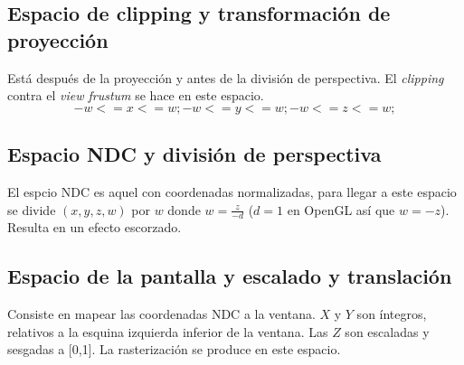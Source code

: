 \subsection{Espacio de clipping y transformación de proyección}
Está después de la proyección y antes de la división de perspectiva. El \textit{clipping} contra el \textit{view frustum} se hace en este espacio.
\begin{equation}
  -w <= x <= w;
  -w <= y <= w;
  -w <= z <= w;
  \end{equation}
\subsection{Espacio NDC y división de perspectiva}
El espcio NDC es aquel con coordenadas normalizadas, para llegar a este espacio se divide $(x,y,z,w)$ por $w$ donde $w = \frac{z}{-d}$ ($d=1$ en OpenGL así que $w= -z$).
Resulta en un efecto escorzado.
\subsection{Espacio de la pantalla y escalado y translación}
Consiste en mapear las coordenadas NDC a la ventana. $X$ y $Y$ son íntegros, relativos a la esquina izquierda inferior de la ventana. Las $Z$ son escaladas y sesgadas a [0,1]. La rasterización se produce en este espacio.
